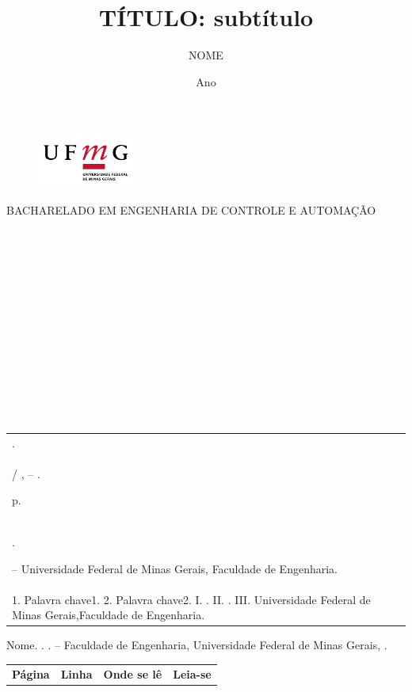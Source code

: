 \documentclass[12pt,a4paper,oneside]{abntex2}
\author{NOME}
\title{TÍTULO: subtítulo}
\date{Ano}
\renewcommand{\imprimircapa}{
	\begin{capa}
		\center 
		\begin{figure}[h]
			\centering
			\includegraphics[width=0.3\textwidth]{principal_completa_ufmg}
			\label{fig:principalcompletaufmg}
		\end{figure}
		{\normalsize BACHARELADO EM ENGENHARIA DE CONTROLE E AUTOMAÇÃO} \\[4.5cm]
		{\normalsize\imprimirautor}\\[4cm]
		{\normalsize\textbf{\imprimirtitulo}}\\
		\vfill
		{\normalsize\imprimirlocal}\\
		{\normalsize\imprimirdata}\\
		
	\end{capa}
}
\newcommand{\folhaderostonova}{
	\center 
	{\normalsize \imprimirautor } \\[5cm]
	{\normalsize \textbf{\imprimirtitulo}} \\[4.5cm]
	\hspace{.45 \textwidth} %
	\begin{minipage}{.5\textwidth}
		\imprimirpreambulo \\ \\
		\imprimirorientadorRotulo \imprimirorientador \\ \\
		\imprimircoorientadorRotulo \imprimircoorientador
	\end{minipage}
	\center
	\vfill
	{\normalsize \imprimirlocal } \\
	{\normalsize \imprimirdata}
}
\begin{document}
	\imprimircapa
	\folhaderostonova
	\newpage
	\begin{fichacatalografica}
		\vspace*{\fill}
		\begin{table}[h]
			\footnotesize %
			\begin{tabular}{|p{12.5cm}|}
				\hline
				\imprimirautor.\\
				
				\hspace{0.5cm} \imprimirtitulo / \imprimirautor, -- \imprimirdata.
				
				\hspace{0.5cm} \pageref{LastPage} p. \\
				
				\hspace{0.5cm} \imprimirorientadorRotulo \imprimirorientador.
				
				\hspace{0.5cm} \imprimirtipotrabalho -- Universidade Federal de Minas Gerais, Faculdade de Engenharia.\\
				
				\hspace{0.5cm}
				1. Palavra chave1.
				2. Palavra chave2.
				I. \imprimirtitulo.
				II. \imprimirorientador.
				III. Universidade Federal de Minas Gerais,Faculdade de Engenharia. \\
				\hline
			\end{tabular}
		\end{table}
		
	\end{fichacatalografica}
	
	\begin{errata}
		\flushleftright
		Nome. \textbf{\imprimirtitulo}. \imprimirdata. \imprimirtipotrabalho -- Faculdade de Engenharia, Universidade Federal de Minas Gerais, \imprimirlocal.
		
		\begin{table}[htb]
			\center
			\footnotesize
			\begin{tabular}{p{1.4cm}p{1cm}p{3cm}p{3cm}}
				\textbf{Página} & \textbf{Linha} & \textbf{Onde se lê}  & \textbf{Leia-se}
			\end{tabular}
		\end{table}
	\end{errata}
	
\end{document}
